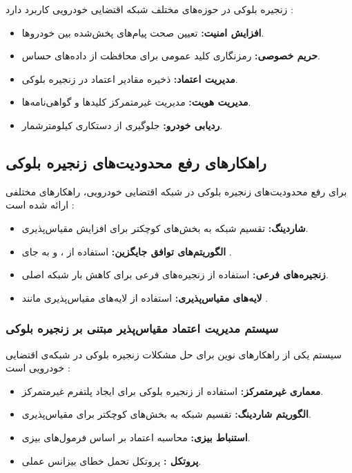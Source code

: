 \documentclass[12pt,a4paper]{article}
\begin{document}
زنجیره بلوکی در حوزه‌های مختلف شبکه اقتضایی خودرویی کاربرد دارد \cite{razaBlockchainBasedReputationTrust2024, hozouriOverviewVANETVehicular2023}:

\begin{itemize}
  \item \textbf{افزایش امنیت:} تعیین صحت پیام‌های پخش‌شده بین خودروها.
  \item \textbf{حریم خصوصی:} رمزنگاری کلید عمومی برای محافظت از داده‌های حساس.
  \item \textbf{مدیریت اعتماد:} ذخیره مقادیر اعتماد در زنجیره بلوکی.
  \item \textbf{مدیریت هویت:} مدیریت غیرمتمرکز کلیدها و گواهی‌نامه‌ها.
  \item \textbf{ردیابی خودرو:} جلوگیری از دستکاری کیلومترشمار.
\end{itemize}

\subsection{راهکارهای رفع محدودیت‌های زنجیره بلوکی}

برای رفع محدودیت‌های زنجیره بلوکی در شبکه اقتضایی خودرویی، راهکارهای مختلفی ارائه شده است \cite{ghovanlooyghajarSBTMSScalableBlockchain2021, razaBlockchainBasedReputationTrust2024}:

\begin{itemize}
  \item \textbf{شاردینگ:} تقسیم شبکه به بخش‌های کوچکتر برای افزایش مقیاس‌پذیری.
  \item \textbf{الگوریتم‌های توافق جایگزین:} استفاده از ،  و  به جای .
  \item \textbf{زنجیره‌های فرعی:} استفاده از زنجیره‌های فرعی برای کاهش بار شبکه اصلی.
  \item \textbf{لایه‌های مقیاس‌پذیری:} استفاده از لایه‌های مقیاس‌پذیری مانند .
\end{itemize}

\subsubsection{سیستم مدیریت اعتماد مقیاس‌پذیر مبتنی بر زنجیره بلوکی }

سیستم  یکی از راهکارهای نوین برای حل مشکلات زنجیره بلوکی در شبکه‌ی اقتضایی خودرویی است \cite{ghovanlooyghajarSBTMSScalableBlockchain2021}:

\begin{itemize}
  \item \textbf{معماری غیرمتمرکز:} استفاده از زنجیره بلوکی برای ایجاد پلتفرم غیرمتمرکز.
  \item \textbf{الگوریتم شاردینگ:} تقسیم شبکه به بخش‌های کوچکتر برای مقیاس‌پذیری.
  \item \textbf{استنباط بیزی:} محاسبه اعتماد بر اساس فرمول‌های بیزی.
  \item \textbf{پروتکل :} پروتکل تحمل خطای بیزانس عملی.
\end{itemize}
\end{document}
